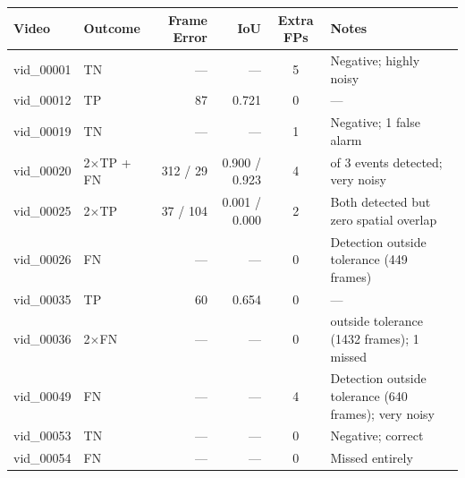 \begin{table}[!htbp]
	\centering
	\small
	\begin{tabularx}{\textwidth}{l l r r c >{\raggedright\arraybackslash}X}
		\toprule
		\textbf{Video} & \textbf{Outcome} & \textbf{Frame Error} & \textbf{IoU}  & \textbf{Extra FPs} & \textbf{Notes}                                       \\
		\midrule
		vid\_00001     & TN               & ---                  & ---           & 5                  & Negative; highly noisy                               \\
		\addlinespace
		vid\_00012     & TP               & 87                   & 0.721         & 0                  & ---                                                  \\
		\addlinespace
		vid\_00019     & TN               & ---                  & ---           & 1                  & Negative; 1 false alarm                              \\
		\addlinespace
		vid\_00020     & 2$\times$TP + FN & 312 / 29             & 0.900 / 0.923 & 4                  & 2 of 3 events detected; very noisy                   \\
		\addlinespace
		vid\_00025     & 2$\times$TP      & 37 / 104             & 0.001 / 0.000 & 2                  & Both detected but zero spatial overlap               \\
		\addlinespace
		vid\_00026     & FN               & ---                  & ---           & 0                  & Detection outside tolerance (449 frames)             \\
		\addlinespace
		vid\_00035     & TP               & 60                   & 0.654         & 0                  & ---                                                  \\
		\addlinespace
		vid\_00036     & 2$\times$FN      & ---                  & ---           & 0                  & 1 outside tolerance (1432 frames); 1 missed          \\
		\addlinespace
		vid\_00049     & FN               & ---                  & ---           & 4                  & Detection outside tolerance (640 frames); very noisy \\
		\addlinespace
		vid\_00053     & TN               & ---                  & ---           & 0                  & Negative; correct                                    \\
		\addlinespace
		vid\_00054     & FN               & ---                  & ---           & 0                  & Missed entirely                                      \\

\end{tabularx}
\end{table}
